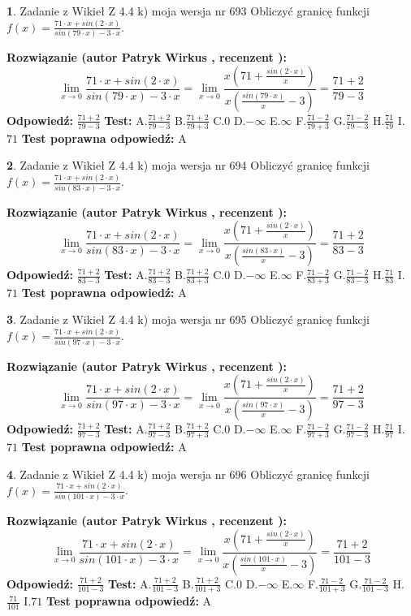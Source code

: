 \documentclass[12pt, a4paper]{article}
\theoremstyle{definition} %
\newtheorem{zad}{}
\newcommand{\zadStart}[1]{\begin{zad}#1\newline}
\newcommand{\zadStop}{\end{zad}}
\newcommand{\rozwStart}[2]{\noindent \textbf{Rozwiązanie (autor #1 , recenzent #2): }\newline}
\newcommand{\rozwStop}{\newline}
\newcommand{\odpStart}{\noindent \textbf{Odpowiedź:}\newline}
\newcommand{\odpStop}{\newline}
\newcommand{\testStart}{\noindent \textbf{Test:}\newline}
\newcommand{\testStop}{\newline}
\newcommand{\kluczStart}{\noindent \textbf{Test poprawna odpowiedź:}\newline}
\newcommand{\kluczStop}{\newline}
\begin{document}
\zadStart{Zadanie z Wikieł Z 4.4 k) moja wersja nr 693}
Obliczyć granicę funkcji $f(x)=\frac{71\cdot x +sin(2\cdot x)}{sin(79\cdot x) -3\cdot x}$.
\zadStop
\rozwStart{Patryk Wirkus}{}
$$\lim\limits_{x\to 0}\frac{71\cdot x +sin(2\cdot x)}{sin(79\cdot x) -3\cdot x}
=\lim\limits_{x\to 0}\frac{x(71+\frac{sin(2\cdot x)}{x})}{x(\frac{sin(79\cdot x)}{x}-3)}
=\frac{71+2}{79-3}$$
\rozwStop
\odpStart
$\frac{71+2}{79-3}$
\odpStop
\testStart
A.$\frac{71+2}{79-3}$
B.$\frac{71+2}{79+3}$
C.$0$
D.$-\infty$
E.$\infty$
F.$\frac{71-2}{79+3}$
G.$\frac{71-2}{79-3}$
H.$\frac{71}{79}$
I.$71$
\testStop
\kluczStart
A
\kluczStop



\zadStart{Zadanie z Wikieł Z 4.4 k) moja wersja nr 694}
Obliczyć granicę funkcji $f(x)=\frac{71\cdot x +sin(2\cdot x)}{sin(83\cdot x) -3\cdot x}$.
\zadStop
\rozwStart{Patryk Wirkus}{}
$$\lim\limits_{x\to 0}\frac{71\cdot x +sin(2\cdot x)}{sin(83\cdot x) -3\cdot x}
=\lim\limits_{x\to 0}\frac{x(71+\frac{sin(2\cdot x)}{x})}{x(\frac{sin(83\cdot x)}{x}-3)}
=\frac{71+2}{83-3}$$
\rozwStop
\odpStart
$\frac{71+2}{83-3}$
\odpStop
\testStart
A.$\frac{71+2}{83-3}$
B.$\frac{71+2}{83+3}$
C.$0$
D.$-\infty$
E.$\infty$
F.$\frac{71-2}{83+3}$
G.$\frac{71-2}{83-3}$
H.$\frac{71}{83}$
I.$71$
\testStop
\kluczStart
A
\kluczStop



\zadStart{Zadanie z Wikieł Z 4.4 k) moja wersja nr 695}
Obliczyć granicę funkcji $f(x)=\frac{71\cdot x +sin(2\cdot x)}{sin(97\cdot x) -3\cdot x}$.
\zadStop
\rozwStart{Patryk Wirkus}{}
$$\lim\limits_{x\to 0}\frac{71\cdot x +sin(2\cdot x)}{sin(97\cdot x) -3\cdot x}
=\lim\limits_{x\to 0}\frac{x(71+\frac{sin(2\cdot x)}{x})}{x(\frac{sin(97\cdot x)}{x}-3)}
=\frac{71+2}{97-3}$$
\rozwStop
\odpStart
$\frac{71+2}{97-3}$
\odpStop
\testStart
A.$\frac{71+2}{97-3}$
B.$\frac{71+2}{97+3}$
C.$0$
D.$-\infty$
E.$\infty$
F.$\frac{71-2}{97+3}$
G.$\frac{71-2}{97-3}$
H.$\frac{71}{97}$
I.$71$
\testStop
\kluczStart
A
\kluczStop



\zadStart{Zadanie z Wikieł Z 4.4 k) moja wersja nr 696}
Obliczyć granicę funkcji $f(x)=\frac{71\cdot x +sin(2\cdot x)}{sin(101\cdot x) -3\cdot x}$.
\zadStop
\rozwStart{Patryk Wirkus}{}
$$\lim\limits_{x\to 0}\frac{71\cdot x +sin(2\cdot x)}{sin(101\cdot x) -3\cdot x}
=\lim\limits_{x\to 0}\frac{x(71+\frac{sin(2\cdot x)}{x})}{x(\frac{sin(101\cdot x)}{x}-3)}
=\frac{71+2}{101-3}$$
\rozwStop
\odpStart
$\frac{71+2}{101-3}$
\odpStop
\testStart
A.$\frac{71+2}{101-3}$
B.$\frac{71+2}{101+3}$
C.$0$
D.$-\infty$
E.$\infty$
F.$\frac{71-2}{101+3}$
G.$\frac{71-2}{101-3}$
H.$\frac{71}{101}$
I.$71$
\testStop
\kluczStart
A
\kluczStop
\end{document}
